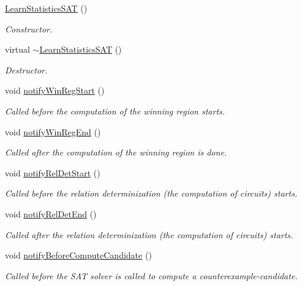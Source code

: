 \begin{DoxyCompactItemize}
\item 
\hyperlink{classLearnStatisticsSAT_af7e87ab9cc1a82e5775fbf49b5edb532}{Learn\-Statistics\-S\-A\-T} ()
\begin{DoxyCompactList}\small\item\em Constructor. \end{DoxyCompactList}\item 
virtual \hyperlink{classLearnStatisticsSAT_a0296238cfd7a8e1d50b1694427fc6863}{$\sim$\-Learn\-Statistics\-S\-A\-T} ()
\begin{DoxyCompactList}\small\item\em Destructor. \end{DoxyCompactList}\item 
void \hyperlink{classLearnStatisticsSAT_ae75ccaa0f80d08aebfc98a953e997579}{notify\-Win\-Reg\-Start} ()
\begin{DoxyCompactList}\small\item\em Called before the computation of the winning region starts. \end{DoxyCompactList}\item 
void \hyperlink{classLearnStatisticsSAT_aef1a7fa18629a82aacde388741a2534c}{notify\-Win\-Reg\-End} ()
\begin{DoxyCompactList}\small\item\em Called after the computation of the winning region is done. \end{DoxyCompactList}\item 
void \hyperlink{classLearnStatisticsSAT_aa90c46fe634b5d230579c5f0cb0b96ad}{notify\-Rel\-Det\-Start} ()
\begin{DoxyCompactList}\small\item\em Called before the relation determinization (the computation of circuits) starts. \end{DoxyCompactList}\item 
void \hyperlink{classLearnStatisticsSAT_aa438b39955c3fc5079c27ad5df743ea8}{notify\-Rel\-Det\-End} ()
\begin{DoxyCompactList}\small\item\em Called after the relation determinization (the computation of circuits) starts. \end{DoxyCompactList}\item 
void \hyperlink{classLearnStatisticsSAT_aed53fb25ba247b25f867df76a71c95dd}{notify\-Before\-Compute\-Candidate} ()
\begin{DoxyCompactList}\small\item\em Called before the S\-A\-T solver is called to compute a counterexample-\/candidate. \end{DoxyCompactList}\item 

\end{DoxyCompactItemize}
